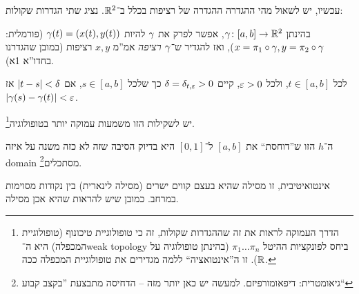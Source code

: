 \documentclass[name=רשימות חדו''א 2א]{../../../tex/classes/noChapterMegasumPreamble}
\begin{document}
	עכשיו, יש לשאול מהי ההגדרה ההגדרה של רציפות בכלל ב־$\mathbb{R}^{2}$. נציג שתי הגדרות שקולות:
	\begin{Definition}
		בהינתן $\gamma \colon [a, b] \to \mathbb{R}^{2}$, 	אפשר לפרק את $\gamma$ להיות $\gamma(t) = (x(t), y(t))$ (פורמלית: $x = \pi_1 \circ \gamma, y = \pi_2 \circ \gamma$), ואז להגדיר ש־$\gamma$ \textit{רציפה} אמ''מ $x, y$ רציפות (במובן שהגדרנו בחדו''א 1א).
	\end{Definition}
	\begin{Definition}
		לכל $t \in [a, b]$, ולכל $\eg > 0$, קיים $\dg = \dg_{t, \eg} > 0$ כך שלכל $s \in [a, b]$, אם $\left \lvert t - s \right \rvert < \delta$ אז $\sof{\cg(s) - \cg(t)} < \eg$.
	\end{Definition}

	יש לשקילות הזו משמעות עמוקה יותר בטופולוגיה\footnote{הדרך העמוקה לראות את זה שההגדרות שקולות, זה כי טופולוגיית טיכונוף (טופולוגיית המכפלה) היא ה־weak topology ביחס לפונקציות ההיטל $\pi_1 \dots \pi_n$ (בהינתן טופולוגיה על $\mathbb{R}$). זו ה''אינטואציה`` ללמה מגדירים את טופולוגיית המכפלה ככה. }.

	ה־$h$ הזו ש''דוחסת`` את $[a, b]$ ל־$[0, 1]$ היא בדיוק הסיבה שזה לא כזה משנה על איזה domain מסתכלים\footnote{גיאומטרית: דיפאומורפיזם. למעשה יש כאן יותר מזה – הדחיסה מתבצעת ''בקצב קבוע``}.


	אינטואיטיבית, זו מסילה שהיא בעצם קווים ישרים (מסילה לינארית) בין נקודות מסוימות במרחב. כמובן שיש להראות שהיא אכן מסילה.


\end{document}
